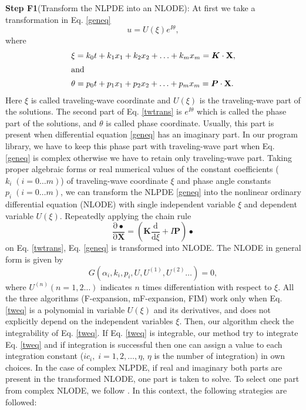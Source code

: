 \documentclass[prd,aps,floats,showkeys,nofootinbib,notitlepage]{revtex4-2}
\begin{document}
	\textbf{Step F1}(Transform the NLPDE into an NLODE): At first we take a transformation in Eq. \eqref{geneq}
	\begin{equation}\label{twtrans}
		u = U(\xi )e^{I\theta},
	\end{equation}
	where
\begin{subequations}\label{twco}
		\begin{align}
		& \xi = k_0t + k_1{x_1} + {k_2}{x_2} +  \ldots  + {k_m}{x_m}=\boldsymbol{K}\cdot\mathbf{X},\\
		\intertext{and}& \theta = {p_0}t + {p_1}{x_1} + {p_2}{x_2} +  \ldots  + {p_m}{x_m}=\boldsymbol{P}\cdot\mathbf{X}.
	\end{align}
\end{subequations}
	Here $\xi$ is called traveling-wave coordinate and $U(\xi )$ is the traveling-wave part  of the solutions. The second part of Eq. \eqref{twtrans} is $e^{I\theta}$ which is called the phase part of the solutions, and $\theta$ is called phase coordinate. Usually, this part is present when differential equation \eqref{geneq} has an imaginary part. In our program library, we have to keep this phase part with traveling-wave part when Eq. \eqref{geneq} is complex otherwise we have to retain only traveling-wave part. Taking proper algebraic forms or real numerical values of the constant coefficients ($k_i\;(i=0\ldots m)$) of traveling-wave coordinate $\xi$ and phase angle constants $p_i\;(i=0\ldots m)$, we can transform the NLPDE \eqref{geneq}  into the nonlinear ordinary differential equation (NLODE) with single independent variable $\xi$ and dependent variable $U(\xi)$. Repeatedly applying the chain rule 
	\begin{equation}\label{twtrans2}
		\frac{\mathrm{\partial} \bullet }{\mathrm{\partial} \mathbf{X}}=\left ( \boldsymbol{K}\frac{\mathrm{d} }{\mathrm{d} \xi}+I\boldsymbol{P} \right )\bullet
	\end{equation}
	on Eq. \eqref{twtrans}, Eq. \eqref{geneq} is transformed into NLODE. The NLODE in general form is given by
	\begin{equation}\label{tweq}
		G\left( {\alpha_i,k_i,p_i,U,U^{(1)},U^{(2)}} \ldots \right) = 0,
	\end{equation}
	where $U^{(n)} (n=1,2\ldots)$ indicates $n$ times differentiation with respect to $\xi$. All the three algorithms (F-expansion, mF-expansion, FIM) work only when Eq. \eqref{tweq} is a polynomial in variable $U(\xi)$ and its derivatives, and does not explicitly depend on the independent variables $\xi$. Then, our algorithm check the integrability of Eq. \eqref{tweq}. If Eq. \eqref{tweq} is integrable, our method try to integrate Eq. \eqref{tweq} and if integration is successful then one can assign a value to each integration constant ($ic_i,\;i=1,2,\ldots,\eta$, $\eta$ is the number of integration) in own choices. In the case of complex NLPDE, if real and imaginary both parts are present in the transformed NLODE, one part is taken to solve. To select one part from complex NLODE, we follow \cite{complexTwt,complexTwt1}. In this context, the following strategies are followed:
\end{document}
